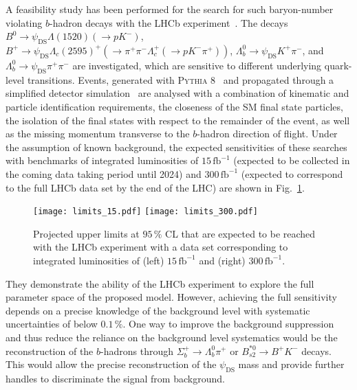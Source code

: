 \documentclass[a4paper,11pt]{article}
\begin{document}
\begin{sloppypar}
A feasibility study has been performed for the search for such baryon-number violating $b$-hadron decays with the LHCb experiment~\cite{DarkBaryonProspects}.
The decays \mbox{$B^0 \rightarrow \psi_{\text{DS}} \Lambda(1520) (\rightarrow pK^-)$},
\mbox{$B^+ \rightarrow \psi_{\text{DS}} \Lambda_c(2595)^+ (\rightarrow \pi^+ \pi^- \Lambda_c^+(\rightarrow p K^- \pi^+ ))$}, \mbox{$\Lambda_b^0 \rightarrow \psi_{\text{DS}} K^+\pi^-$}, and \mbox{$\Lambda_b^0 \rightarrow \psi_{\text{DS}}\pi^+\pi^-$} are investigated, which are sensitive to different underlying quark-level transitions.
Events, generated with \textsc{Pythia} 8~\cite{Pythia} and propagated through a simplified detector simulation~\cite{DetSim} are analysed with a combination of kinematic and particle identification requirements, the closeness of the SM final state particles, the isolation of the final states with respect to the remainder of the event, as well as the missing momentum transverse to the $b$-hadron direction of flight.
Under the assumption of known background, the expected sensitivities of these searches with benchmarks of integrated luminosities of $15\,\text{fb}^{-1}$ (expected to be collected in the coming data taking period until 2024) and $300\,\text{fb}^{-1}$ (expected to correspond to the full LHCb data set by the end of the LHC) are shown in Fig.~\ref{fig:limits_baryoDM}.
\begin{figure}
\centering
\texttt{[image: limits\_15.pdf]}
\texttt{[image: limits\_300.pdf]}
\caption{Projected upper limits at $95\,\%$ CL that are expected to be reached with the LHCb experiment with a data set corresponding to integrated luminosities of (left) $15\,\text{fb}^{-1}$ and (right) $300\,\text{fb}^{-1}$.}
\label{fig:limits_baryoDM}
\end{figure}
They demonstrate the ability of the LHCb experiment to explore the full parameter space of the proposed model.
However, achieving the full sensitivity depends on a precise knowledge of the background level with systematic uncertainties of below $0.1\,\%$.
One way to improve the background suppression and thus reduce the reliance on the background level systematics would be the reconstruction of the $b$-hadrons through $\Sigma^+_b\to\Lambda^0_b\pi^+$ or $B_{s2}^{\ast 0}\rightarrow B^+ K^-$ decays. This would allow the precise reconstruction of the $\psi_{\text{DS}}$ mass and provide further handles to discriminate the signal from background.
\end{sloppypar}
\end{document}

